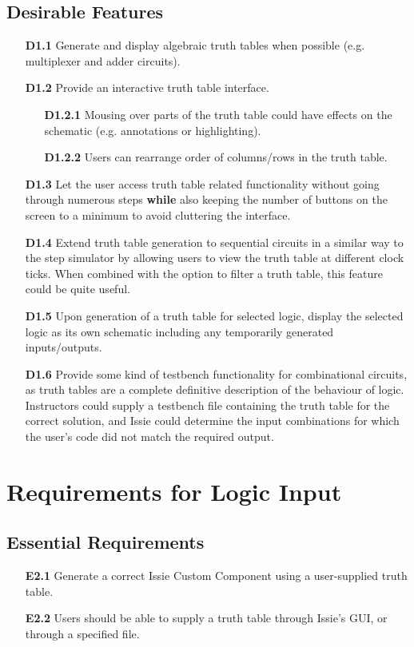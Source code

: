 \subsection*{Desirable Features}
\begin{itemize}
    \item[\textbf{D1.1}] Generate and display algebraic truth tables when possible (e.g. multiplexer and adder circuits).
    \medskip
    \item[\textbf{D1.2}] Provide an interactive truth table interface.
    \begin{itemize}
        \item[\textbf{D1.2.1}] Mousing over parts of the truth table could have effects on the schematic (e.g. annotations or highlighting).
        \item[\textbf{D1.2.2}] Users can rearrange order of columns/rows in the truth table.
    \end{itemize}
    \medskip
    \item[\textbf{D1.3}] Let the user access truth table related functionality without going through numerous steps \textbf{while} also keeping the number of buttons on the screen to a minimum to avoid cluttering the interface. 
    \medskip
    \item[\textbf{D1.4}] Extend truth table generation to sequential circuits in a similar way to the step simulator by allowing users to view the truth table at different clock ticks. When combined with the option to filter a truth table, this feature could be quite useful.
    \medskip
    \item[\textbf{D1.5}] Upon generation of a truth table for selected logic, display the selected logic as its own schematic including any temporarily generated inputs/outputs.
    \medskip
    \item[\textbf{D1.6}] Provide some kind of testbench functionality for combinational circuits, as truth tables are a complete definitive description of the behaviour of logic. Instructors could supply a testbench file containing the truth table for the correct solution, and Issie could determine the input combinations for which the user's code did not match the required output.
    \medskip
\end{itemize}

\section{Requirements for Logic Input}
\subsection*{Essential Requirements}
\begin{itemize}
    \item[\textbf{E2.1}] Generate a correct Issie Custom Component using a user-supplied truth table.
    \medskip
    \item[\textbf{E2.2}] Users should be able to supply a truth table through Issie's GUI, or through a specified file.
\end{itemize}

